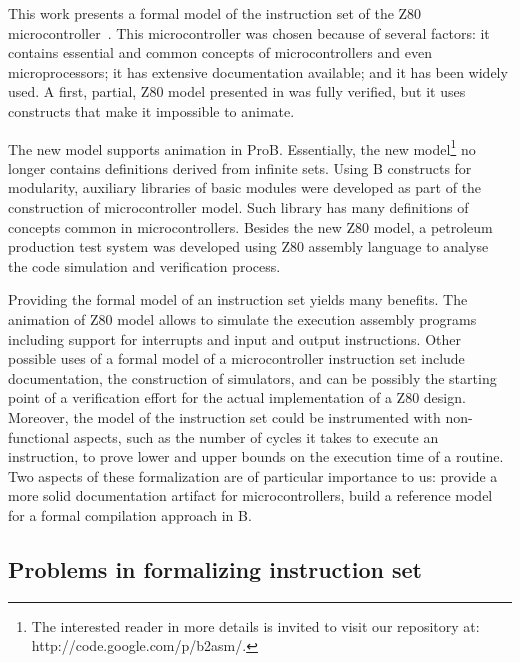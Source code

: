 \documentclass[a4paper]{llncs}
\begin{document}
This work presents a formal model of the instruction set of the Z80
microcontroller~\cite{Z80_manual}. This microcontroller was chosen
because of several factors: it contains essential and common concepts
of microcontrollers and even microprocessors; it has extensive
documentation available; and it has been widely used.  A first,
partial, Z80 model presented in \cite{Valerio_SBMF09} was fully
verified, but it uses constructs that make it impossible to animate.

The new model supports animation in ProB\cite{proB}.  Essentially, the
new model\footnote{The interested reader in more details is invited to
  visit our repository at: http://code.google.com/p/b2asm/.}  no
longer contains definitions derived from infinite sets. Using B
constructs for modularity, auxiliary libraries of basic modules were
developed as part of the construction of microcontroller model. Such
library has many definitions of concepts common in microcontrollers.
Besides the new Z80 model, a petroleum production test system was
developed using Z80 assembly language to analyse the code simulation
and verification process.

Providing the formal model of an instruction set yields many
benefits. The animation of Z80 model allows to simulate the execution
assembly programs including support for interrupts and input and
output instructions. Other possible uses of a formal model of a
microcontroller instruction set include documentation, the
construction of simulators, and can be possibly the starting point of
a verification effort for the actual implementation of a Z80
design. Moreover, the model of the instruction set could be
instrumented with non-functional aspects, such as the number of cycles
it takes to execute an instruction, to prove lower and upper bounds on
the execution time of a routine.  Two aspects of these formalization
are of particular importance to us: provide a more solid documentation
artifact for microcontrollers, build a reference model for a formal
compilation approach in B.


\subsection{Problems in formalizing instruction set}
\end{document}
